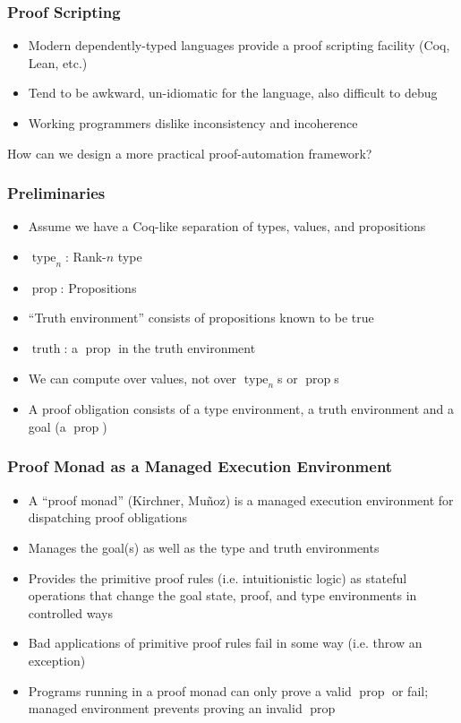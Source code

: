 \documentclass{beamer}
\newcommand{\typekw}[1]{\ensuremath{{\operatorname{type}}_{#1}}}
\newcommand{\propkw}{\ensuremath{\operatorname{prop}}}
\newcommand{\truthkw}{\ensuremath{\operatorname{truth}}}
\begin{document}
\begin{frame}
  \frametitle{Proof Scripting}
  \begin{itemize}
    \item Modern dependently-typed languages provide a proof scripting
      facility (Coq, Lean, etc.)
    \item Tend to be awkward, un-idiomatic for the language, also
      difficult to debug
    \item Working programmers dislike inconsistency and incoherence
  \end{itemize}
  How can we design a more practical proof-automation framework?
\end{frame}

\begin{frame}
  \frametitle{Preliminaries}
  \begin{itemize}
    \item Assume we have a Coq-like separation of types, values, and
      propositions
    \item \typekw{n}: Rank-$n$ type
    \item \propkw{}: Propositions
    \item ``Truth environment'' consists of propositions known to be true
    \item \truthkw{}: a \propkw{} in the truth environment
    \item We can compute over values, not over \typekw{n}s or
      \propkw{}s
    \item A proof obligation consists of a type environment, a truth
      environment and a goal (a \propkw)
  \end{itemize}
\end{frame}

\begin{frame}
  \frametitle{Proof Monad as a Managed Execution Environment}
  \begin{itemize}
    \item A ``proof monad'' (Kirchner, Mu\~{n}oz) is a managed
      execution environment for dispatching proof obligations
    \item Manages the goal(s) as well as the type and truth
      environments
    \item Provides the primitive proof rules (i.e. intuitionistic
      logic) as stateful operations that change the goal state, proof,
      and type environments in controlled ways
    \item Bad applications of primitive proof rules fail in some way
      (i.e. throw an exception)
    \item Programs running in a proof monad can only prove a valid
      \propkw{} or fail; managed environment prevents proving an
      invalid \propkw{}
  \end{itemize}
\end{frame}
\end{document}
